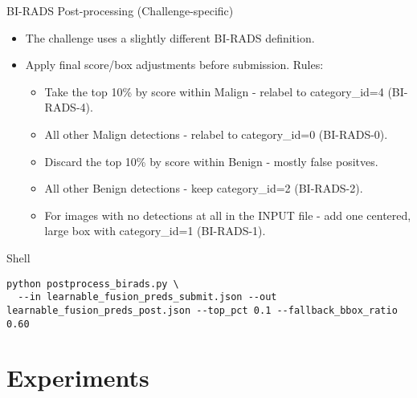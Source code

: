 \documentclass[aspectratio=169]{beamer}
\begin{document}
\begin{frame}[fragile]{BI-RADS Post-processing (Challenge-specific)}
  \begin{itemize}
    \item The challenge uses a slightly different \alert{BI-RADS} definition.
    \item Apply final score/box adjustments before submission. Rules:\begin{itemize}
    \item Take the top 10\% by score within Malign - relabel to category\_id=4 (BI-RADS-4).
    \item All other Malign detections - relabel to category\_id=0 (BI-RADS-0).
    \item Discard the top 10\% by score within Benign - mostly false positves.
    \item All other Benign detections - keep category\_id=2 (BI-RADS-2).
    \item For images with no detections at all in the INPUT file - add one centered, large box with category\_id=1 (BI-RADS-1).
\end{itemize}
  \end{itemize}
  \begin{block}{Shell}
\tiny
\begin{verbatim}
python postprocess_birads.py \
  --in learnable_fusion_preds_submit.json --out learnable_fusion_preds_post.json --top_pct 0.1 --fallback_bbox_ratio 0.60
\end{verbatim}
  \end{block}
\end{frame}

\section{Experiments}
\end{document}
